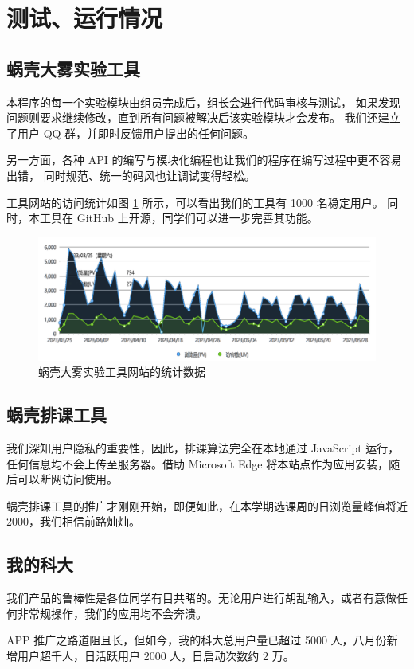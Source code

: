 \section{测试、运行情况}

\subsection{蜗壳大雾实验工具}

本程序的每一个实验模块由组员完成后，组长会进行代码审核与测试，
如果发现问题则要求继续修改，直到所有问题被解决后该实验模块才会发布。
我们还建立了用户 QQ 群，并即时反馈用户提出的任何问题。

另一方面，各种 API 的编写与模块化编程也让我们的程序在编写过程中更不容易出错，
同时规范、统一的码风也让调试变得轻松。


工具网站的访问统计如图 \ref{fig:2} 所示，可以看出我们的工具有 1000 名稳定用户。
同时，本工具在 GitHub 上开源，同学们可以进一步完善其功能。

\begin{figure}[htbp]
  \centering
  \includegraphics[width=\columnwidth]{figure/2.png}
  \caption{蜗壳大雾实验工具网站的统计数据}
  \label{fig:2}
\end{figure}

\subsection{蜗壳排课工具}

我们深知用户隐私的重要性，因此，排课算法完全在本地通过 JavaScript 运行，任何信息均不会上传至服务器。借助 Microsoft Edge 将本站点作为应用安装，随后可以断网访问使用。

蜗壳排课工具的推广才刚刚开始，即便如此，在本学期选课周的日浏览量峰值将近 2000，我们相信前路灿灿。

\subsection{我的科大}

我们产品的鲁棒性是各位同学有目共睹的。无论用户进行胡乱输入，或者有意做任何非常规操作，我们的应用均不会奔溃。

APP 推广之路道阻且长，但如今，我的科大总用户量已超过 5000 人，八月份新增用户超千人，日活跃用户 2000 人，日启动次数约 2 万。
